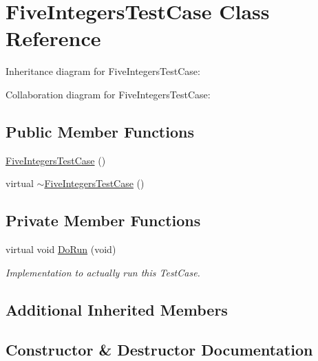 \hypertarget{classFiveIntegersTestCase}{}\section{Five\+Integers\+Test\+Case Class Reference}
\label{classFiveIntegersTestCase}


Inheritance diagram for Five\+Integers\+Test\+Case\+:


Collaboration diagram for Five\+Integers\+Test\+Case\+:
\subsection*{Public Member Functions}
\begin{DoxyCompactItemize}
\item 
\hyperlink{classFiveIntegersTestCase_a4a258341d24390e194e26fd7167a9aef}{Five\+Integers\+Test\+Case} ()
\item 
virtual \hyperlink{classFiveIntegersTestCase_ae6eae19c95b642e7a3adc9eef0326ce2}{$\sim$\+Five\+Integers\+Test\+Case} ()
\end{DoxyCompactItemize}
\subsection*{Private Member Functions}
\begin{DoxyCompactItemize}
\item 
virtual void \hyperlink{classFiveIntegersTestCase_ae59367f468ecf68bcc4b92bf4df5660c}{Do\+Run} (void)
\begin{DoxyCompactList}\small\item\em Implementation to actually run this Test\+Case. \end{DoxyCompactList}\end{DoxyCompactItemize}
\subsection*{Additional Inherited Members}


\subsection{Constructor \& Destructor Documentation}
